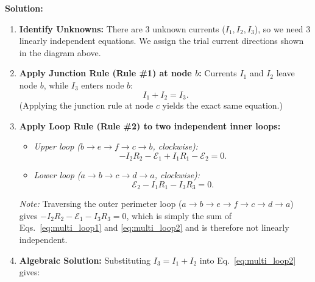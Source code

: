\begin{example}
\begin{center}
\end{center}

\textbf{Solution:}
\begin{enumerate}
    \item \textbf{Identify Unknowns:} There are 3 unknown currents ($I_1, I_2, I_3$), so we need 3 linearly independent equations. We assign the trial current directions shown in the diagram above.
    \item \textbf{Apply Junction Rule (Rule \#1) at node $b$:} Currents $I_1$ and $I_2$ leave node $b$, while $I_3$ enters node $b$:
    \begin{equation}
        I_1 + I_2 = I_3. \label{eq:multi_junc}
    \end{equation}
    (Applying the junction rule at node $c$ yields the exact same equation.)
    \item \textbf{Apply Loop Rule (Rule \#2) to two independent inner loops:}
    \begin{itemize}
        \item \emph{Upper loop ($b \to e \to f \to c \to b$, clockwise):}
        \begin{equation}
            -I_2 R_2 - \mathcal{E}_1 + I_1 R_1 - \mathcal{E}_2 = 0. \label{eq:multi_loop1}
        \end{equation}
        \item \emph{Lower loop ($a \to b \to c \to d \to a$, clockwise):}
        \begin{equation}
            \mathcal{E}_2 - I_1 R_1 - I_3 R_3 = 0. \label{eq:multi_loop2}
        \end{equation}
    \end{itemize}
    \emph{Note:} Traversing the outer perimeter loop ($a \to b \to e \to f \to c \to d \to a$) gives $-I_2 R_2 - \mathcal{E}_1 - I_3 R_3 = 0$, which is simply the sum of Eqs.~\eqref{eq:multi_loop1} and \eqref{eq:multi_loop2} and is therefore not linearly independent.
    \item \textbf{Algebraic Solution:} Substituting $I_3 = I_1 + I_2$ into Eq.~\eqref{eq:multi_loop2} gives:

\end{enumerate}
\end{example}
